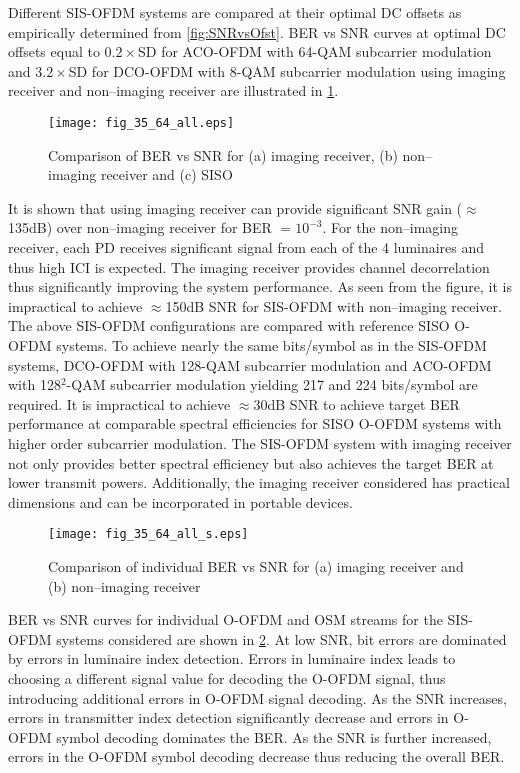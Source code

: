 Different SIS-OFDM systems are compared at their optimal DC offsets as empirically determined from \figurename{ \ref{fig:SNRvsOfst}}. BER vs SNR curves at optimal DC offsets equal to $0.2\times$SD for ACO-OFDM with 64-QAM subcarrier modulation and $3.2\times$SD for DCO-OFDM with 8-QAM subcarrier modulation using imaging receiver and non--imaging receiver are illustrated in \figurename{ \ref{fig:BERnet}}. 
\begin{figure}[!t]
\centering
\texttt{[image: fig\_35\_64\_all.eps]}
\caption{Comparison of BER vs SNR for (a) imaging receiver, (b) non--imaging receiver and (c) SISO}
	\label{fig:BERnet}
\end{figure}
It is shown that using imaging receiver can provide significant SNR gain ($\approx$135dB) over non--imaging receiver for BER $=10^{-3}$. For the non--imaging receiver, each PD receives significant signal from each of the 4 luminaires and thus high ICI is expected. The imaging receiver provides channel decorrelation thus significantly improving the system performance. As seen from the figure, it is impractical to achieve $\approx$150dB SNR for SIS-OFDM with non--imaging receiver. The above SIS-OFDM configurations are compared with reference SISO O-OFDM systems. To achieve nearly the same bits/symbol as in the SIS-OFDM systems, DCO-OFDM with 128-QAM subcarrier modulation and ACO-OFDM with 128$^2$-QAM subcarrier modulation yielding 217 and 224 bits/symbol are required. It is impractical to achieve $\approx$30dB SNR to achieve target BER performance at comparable spectral efficiencies for SISO O-OFDM systems with higher order subcarrier modulation. The SIS-OFDM system with imaging receiver not only provides better spectral efficiency but also achieves the target BER at lower transmit powers. Additionally, the imaging receiver considered has practical dimensions and can be incorporated in portable devices.

\begin{figure}[!t]
\centering
\texttt{[image: fig\_35\_64\_all\_s.eps]}
\caption{Comparison of individual BER vs SNR for (a) imaging receiver and (b) non--imaging receiver}
	\label{fig:BERsplit}
\end{figure}

BER vs SNR curves for individual O-OFDM and OSM streams for the SIS-OFDM systems considered are shown in \figurename{\ref{fig:BERsplit}}. At low SNR, bit errors are dominated by errors in luminaire index detection. Errors in luminaire index leads to choosing a different signal value for decoding the O-OFDM signal, thus introducing additional errors in O-OFDM signal decoding. As the SNR increases, errors in transmitter index detection significantly decrease and errors in O-OFDM symbol decoding dominates the BER. As the SNR is further increased, errors in the O-OFDM symbol decoding decrease thus reducing the overall BER.

